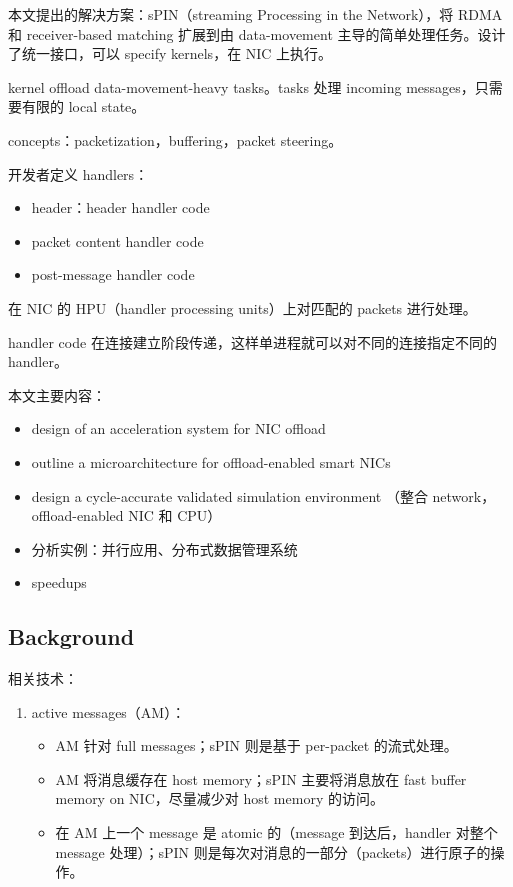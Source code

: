 \documentclass[cn,pad,11pt,green,geye]{../elegantnote}
\begin{document}
本文提出的解决方案：sPIN（streaming Processing in the Network），将 RDMA 和 receiver-based matching 扩展到由 data-movement 主导的简单处理任务。设计了统一接口，可以 specify kernels，在 NIC 上执行。

kernel offload data-movement-heavy tasks。tasks 处理 incoming messages，只需要有限的 local state。

concepts：packetization，buffering，packet steering。

开发者定义 handlers：
\begin{itemize}
   \item header：header handler code
   \item packet content handler code
   \item post-message handler code
\end{itemize}

在 NIC 的 HPU（handler processing units）上对匹配的 packets 进行处理。

handler code 在连接建立阶段传递，这样单进程就可以对不同的连接指定不同的 handler。

本文主要内容：
\begin{itemize}
   \item design of an acceleration system for NIC offload
   \item outline a microarchitecture for offload-enabled smart NICs
   \item design a cycle-accurate validated simulation environment （整合 network，offload-enabled NIC 和 CPU）
   \item 分析实例：并行应用、分布式数据管理系统
   \item speedups
\end{itemize}

\subsection{Background}
相关技术：

\begin{enumerate}
   \item active messages（AM）：
      \begin{itemize}
         \item AM 针对 full messages；sPIN 则是基于 per-packet 的流式处理。
         \item AM 将消息缓存在 host memory；sPIN 主要将消息放在 fast buffer memory on NIC，尽量减少对 host memory 的访问。
         \item 在 AM 上一个 message 是 atomic 的（message 到达后，handler 对整个 message 处理）；sPIN 则是每次对消息的一部分（packets）进行原子的操作。
      \end{itemize}
\end{enumerate}
\end{document}
